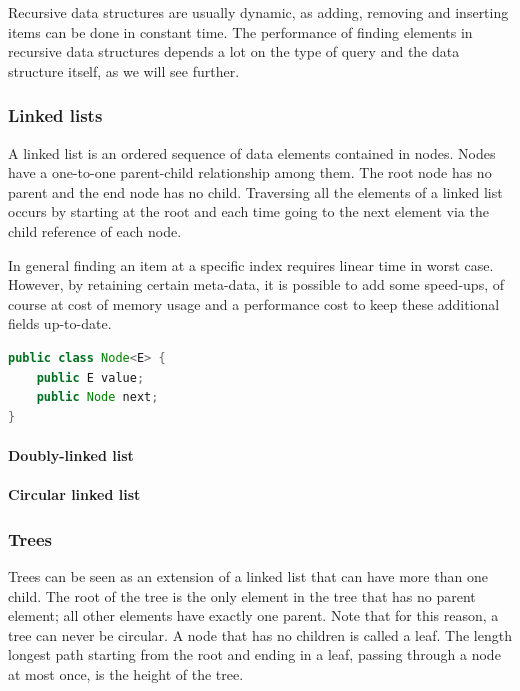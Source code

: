 Recursive data structures are usually dynamic, as adding, removing and inserting items can be done in constant time. The performance of finding elements in recursive data structures depends a lot on the type of query and the data structure itself, as we will see further.


\subsubsection{Linked lists}

A linked list is an ordered sequence of data elements contained in nodes. Nodes have a one-to-one parent-child relationship among them. The root node has no parent and the end node has no child. Traversing all the elements of a linked list occurs by starting at the root and each time going to the next element via the child reference of each node.

In general finding an item at a specific index requires linear time in worst case. However, by retaining certain meta-data, it is possible to add some speed-ups, of course at cost of memory usage and a performance cost to keep these additional fields up-to-date.

\begin{lstlisting}[language=java, caption=Node implementation for a linked list., label=listing:node-linked-list]
public class Node<E> {
	public E value;
	public Node next;
}
\end{lstlisting}


\paragraph{Doubly-linked list}


\paragraph{Circular linked list}




\subsubsection{Trees}

Trees can be seen as an extension of a linked list that can have more than one child. The root of the tree is the only element in the tree that has no parent element; all other elements have exactly one parent. Note that for this reason, a tree can never be circular. A node that has no children is called a leaf. The length longest path starting from the root and ending in a leaf, passing through a node at most once, is the height of the tree.


